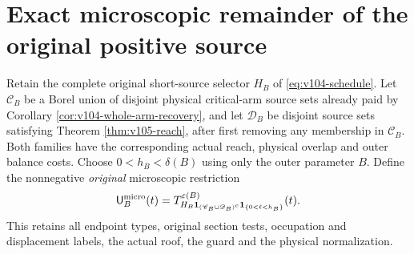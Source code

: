 \section{Exact microscopic remainder of the original positive source}
\label{sec:v105-endpoint}
Retain the complete original short-source selector $H_B$ of
\eqref{eq:v104-schedule}. Let $\mathscr C_B$ be a Borel union
of disjoint physical critical-arm source sets already paid by
Corollary \ref{cor:v104-whole-arm-recovery}, and let
$\mathscr D_B$ be disjoint source sets satisfying Theorem
\ref{thm:v105-reach}, after first removing any membership in
$\mathscr C_B$. Both families have the corresponding actual reach,
physical overlap and outer balance costs. Choose
$0<h_B<\delta(B)$ using only the outer parameter $B$.
Define the nonnegative \emph{original} microscopic restriction
\begin{equation}\label{eq:v105-micro}
\mathsf U_B^{\rm micro}(t)=
T_{H_B\mathbf1_{(\mathscr C_B\cup\mathscr D_B)^c}
       \mathbf1_{\{0<\ell<h_B\}}}^{\varepsilon(B)}(t).
\end{equation}
This retains all endpoint types, original section tests,
occupation and displacement labels, the actual roof, the guard
and the physical normalization.

